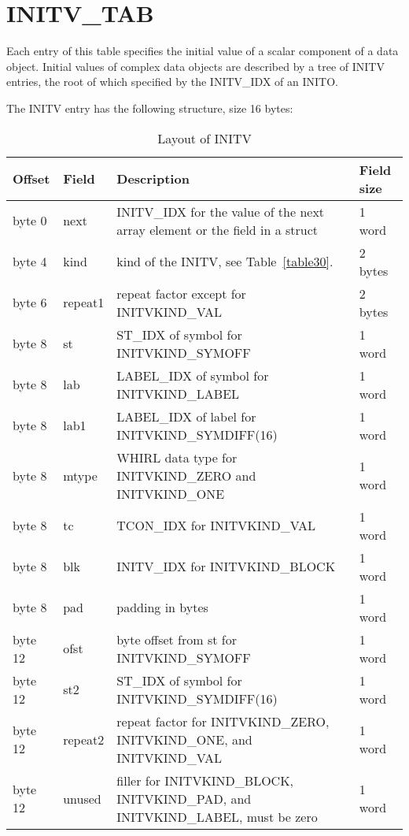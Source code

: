 \section{INITV\_TAB}

Each entry of this table specifies the initial value of a scalar
component of a data object. Initial values of complex data objects are
described by a tree of
%
INITV entries, the root of which specified by
the
%
INITV\_IDX of an INITO.

The
%
INITV entry has the following structure, size 16 bytes:

\begin{center}
\begin{longtable}{|p{.5in}|p{.5in}|p{3in}|p{.75in}|}
\caption{Layout of INITV\label{table29}}\\
\hline
Offset & Field & Description & Field size\\\hline\hline
byte 0 &next &
\index{INITV\_IDX}%
INITV\_IDX for the value of the next array element or the
field in a struct & 1 word\\\hline
byte 4 & kind & kind of the INITV, see Table~\ref{table30}. & 2 bytes \\\hline
byte 6 & repeat1 & repeat factor except for
\index{INITVKIND\_VAL}%
INITVKIND\_VAL & 2 bytes \\\hline
byte 8 & st &
\index{ST\_IDX}%
ST\_IDX of symbol for
\index{INITVKIND\_SYMOFF}%
INITVKIND\_SYMOFF & 1 word \\\hline
byte 8 & lab &
\index{LABEL\_IDX}%
LABEL\_IDX of symbol for
\index{INITVKIND\_LABEL}%
INITVKIND\_LABEL & 1 word \\\hline
byte 8 & lab1 &
\index{LABEL\_IDX}%
LABEL\_IDX of label for INITVKIND\_SYMDIFF(16) & 1 word \\\hline
byte 8 & mtype & WHIRL data type for
\index{INITVKIND\_ZERO}%
INITVKIND\_ZERO and
\index{INITVKIND\_ONE}%
INITVKIND\_ONE & 1 word \\\hline
byte 8 & tc &
\index{TCON\_IDX}%
TCON\_IDX for
\index{INITVKIND\_VAL}%
INITVKIND\_VAL & 1 word \\\hline
byte 8 & blk &
\index{INITV\_IDX}%
INITV\_IDX for
\index{INITVKIND\_BLOCK}%
INITVKIND\_BLOCK & 1 word \\\hline
byte 8 & pad & padding in bytes & 1 word \\\hline
byte 12 & ofst & byte offset from st for
\index{INITVKIND\_SYMOFF}%
INITVKIND\_SYMOFF & 1 word \\\hline
byte 12 & st2 &
\index{ST\_IDX}%
ST\_IDX of symbol for INITVKIND\_SYMDIFF(16) & 1 word \\\hline
byte 12 & repeat2 & repeat factor for INITVKIND\_ZERO, INITVKIND\_ONE,
and
\index{INITVKIND\_VAL}%
INITVKIND\_VAL & 1 word \\\hline
byte 12 & unused & filler for INITVKIND\_BLOCK, INITVKIND\_PAD, and
INITVKIND\_LABEL, must be zero & 1 word \\\hline
\end{longtable}
\end{center}



